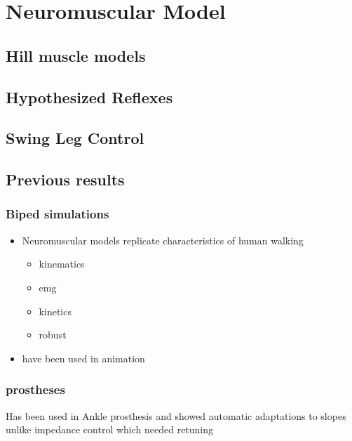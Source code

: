 \chapter{Neuromuscular Model}

\section{Hill muscle models}
\section{Hypothesized Reflexes}
\section{Swing Leg Control}
\section{Previous results}

\subsection{Biped simulations}
    \begin{itemize}
        \item Neuromuscular models replicate characteristics of human walking
        \begin{itemize}
            \item kinematics
            \item emg
            \item kinetics
            \item robust
        \end{itemize}

        \item have been used in animation
    \end{itemize}

\subsection{prostheses}
    Has been used in Ankle prosthesis and showed automatic adaptations to slopes
    unlike impedance control which needed retuning
